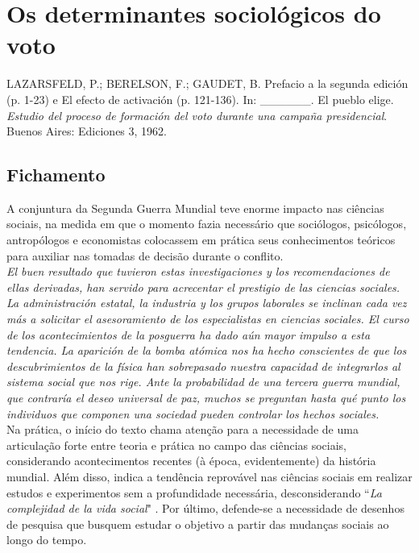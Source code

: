\section{Os determinantes sociológicos do voto}

LAZARSFELD, P.; BERELSON, F.; GAUDET, B. Prefacio a la segunda edición (p. 1-23) e El
efecto de activación (p. 121-136). In: \_\_\_\_\_\_. El pueblo elige. \textit{Estudio del proceso de formación del voto durante una campaña presidencial}. Buenos Aires: Ediciones 3, 1962.

\subsection{Fichamento}
A conjuntura da Segunda Guerra Mundial teve enorme impacto nas ciências sociais, na medida em que o momento fazia necessário que sociólogos, psicólogos, antropólogos e economistas colocassem em prática seus conhecimentos teóricos para auxiliar nas tomadas de decisão durante o conflito. \\

\noindent \textit{El buen resultado que tuvieron estas investigaciones y los recomendaciones de ellas derivadas, han servido para acrecentar el prestigio de las ciencias sociales. La administración estatal, la industria y los grupos laborales se inclinan cada vez más a solicitar el asesoramiento de los especialistas en ciencias sociales. El curso de los acontecimientos de la posguerra ha dado aún mayor impulso a esta tendencia. La aparición de la bomba atómica nos ha hecho conscientes de que los descubrimientos de la
física han sobrepasado nuestra capacidad de integrarlos al sistema social que nos rige. Ante la probabilidad de una tercera guerra mundial, que contraría el deseo universal de paz, muchos se preguntan hasta qué punto los individuos que componen una sociedad pueden controlar los hechos sociales.} \cite[~p. 1]{lazarsfeld_berelson_gaudet} \\

\noindent Na prática, o início do texto chama atenção para a necessidade de uma articulação forte entre teoria e prática no campo das ciências sociais, considerando acontecimentos recentes (à época, evidentemente) da história mundial. Além disso, indica a tendência reprovável nas ciências sociais em realizar estudos e experimentos sem a profundidade necessária, desconsiderando ``\textit{La complejidad de la vida social}" \cite[~p. 2]{lazarsfeld_berelson_gaudet}. Por último, defende-se a necessidade de desenhos de pesquisa que busquem estudar o objetivo a partir das mudanças sociais ao longo do tempo. \\

